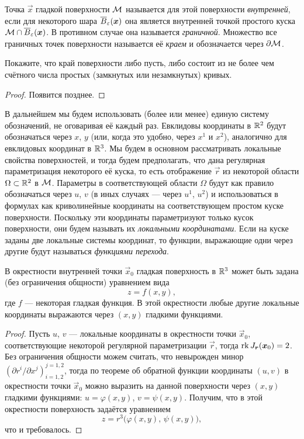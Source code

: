 \begin{definition}
	Точка $\vec{x}$ гладкой поверхности $\mathcal{M}$ называется для этой поверхности \textit{внутренней}, если для некоторого шара $\overline{B}_\varepsilon(\boldsymbol{x})$ она является внутренней точкой простого куска $\mathcal{M} \cap \overline{B}_\varepsilon(\boldsymbol{x})$. В противном случае она называется \textit{граничной}. Множество все граничных точек поверхности называется её \textit{краем} и обозначается через $\partial\mathcal{M}$.
\end{definition}

\begin{proposition}
	Покажите, что край поверхности либо пусть, либо состоит из не более чем счётного числа простых (замкнутых или незамкнутых) кривых.
\end{proposition}

\begin{proof} %
	Появится позднее.
\end{proof}

В дальнейшем мы будем использовать (более или менее) единую систему обозначений, не оговаривая её каждый раз. Евклидовы координаты в $\mathbb{R}^2$ будут обозначаться через $x$, $y$ (или, когда это удобно, через $x^1$ и $x^2$), аналогично для евклидовых координат в $\mathbb{R}^3$. Мы будем в основном рассматривать локальные свойства поверхностей, и тогда будем предполагать, что дана регулярная параметризация некоторого её куска, то есть отображение $\vec{r}$ из некоторой области $\Omega \subset \mathbb{R}^2$ в $\mathcal{M}$. Параметры в соответствующей области $\Omega$ будут как правило обозначаться через $u$, $v$ (в иных случаях --- через $u^1$, $u^2$) и использоваться в формулах как криволинейные координаты на соответствующем простом куске поверхности. Поскольку эти координаты параметризуют только кусок поверхности, они будем называть их \textit{локальными координатами}. Если на куске заданы две локальные системы координат, то функции, выражающие одни через другие будут называться \textit{функциями перехода}.

\begin{proposition}
	В окрестности внутренней точки $\vec{x}_0$ гладкая поверхность в $\mathbb{R}^3$ может быть задана (без ограничения общности) уравнением вида
	\[
		z = f(x, y),
	\]
	где $f$ --- некоторая гладкая функция. В этой окрестности любые другие локальные координаты выражаются через $(x, y)$ гладкими функциями.
\end{proposition}

\begin{proof}
	Пусть $u$, $v$ --- локальные координаты в окрестности точки $\vec{x}_0$, соответствующие некоторой регулярной параметризации $\vec{r}$, тогда $\operatorname{rk} J_{\boldsymbol{r}}(\boldsymbol{x}_0) = 2$. Без ограничения общности можем считать, что невырожден минор $(\partial r^i / \partial x^j)_{i = 1, 2}^{j = 1, 2}$, тогда по теореме об обратной функции координаты $(u, v)$ в окрестности точки $\vec{x}_0$ можно выразить на данной поверхности через $(x, y)$ гладкими функциями: $u = \varphi(x, y)$, $v = \psi(x, y)$. Получим, что в этой окрестности поверхность задаётся уравнением
	\[
		z = r^3\big(\varphi(x, y),\,\psi(x, y)\big),
	\]
	что и требовалось.
\end{proof}

